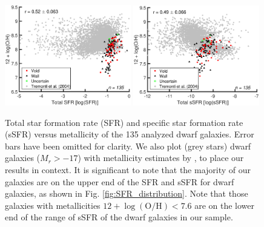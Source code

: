 \begin{figure}
    \centering
    \includegraphics[width=0.49\textwidth]{Images/Paper1/SFR_OH_1sig_I06_dwarf_SF_t3}
    \includegraphics[width=0.49\textwidth]{Images/Paper1/sSFR_OH_1sig_I06_dwarf_SF_t3}
    \caption[(s)SFR versus metallicity for 135 dwarf galaxy sample]{Total star 
    formation rate (SFR) and specific star formation rate (sSFR) versus 
    metallicity of the 135 analyzed dwarf galaxies.  Error bars have been 
    omitted for clarity.  We also plot (grey stars) dwarf galaxies ($M_r > -17$) 
    with metallicity estimates by \cite{Tremonti04}, to place our results in 
    context.  It is significant to note that the majority of our galaxies are on 
    the upper end of the SFR and sSFR for dwarf galaxies, as shown in Fig. 
    \ref{fig:SFR_distribution}.  Note that those galaxies with metallicities 
    $12 + \log(\text{O}/\text{H}) < 7.6$ are on the lower end of the range of 
    sSFR of the dwarf galaxies in our sample.}
    \label{fig:SFRZ_relation}
\end{figure}

